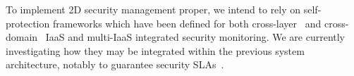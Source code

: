 \documentclass{sig-alternate}
\begin{document}
To implement 2D security management proper, we intend to rely on self-protection frameworks which have been defined for both cross-layer~\cite{VESPA} and cross-domain~\cite{VESPA:UCC} IaaS and multi-IaaS integrated security monitoring. We are currently investigating how they may be integrated within the previous system architecture, notably to guarantee security SLAs~\cite{CUMULUS}.


\end{document}
